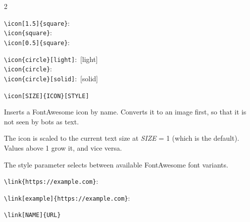 \begin{paracol}{2}
    \vspace{4mm}

    \switchcolumn*

    \begin{center}
      \color{page}

      \begingroup\color{lightgray}\verb!\icon[1.5]{square}!:\endgroup\ \\
      \begingroup\color{lightgray}\verb!\icon{square}!:\endgroup\ \\
      \begingroup\color{lightgray}\verb!\icon[0.5]{square}!:\endgroup\ 

      \begingroup\color{lightgray}\verb!\icon{circle}[light]!:\endgroup\ [light]\\
      \begingroup\color{lightgray}\verb!\icon{circle}!:\endgroup\ \\
      \begingroup\color{lightgray}\verb!\icon{circle}[solid]!:\endgroup\ [solid]

    \end{center}

    \switchcolumn

    \verb!\icon[SIZE]{ICON}[STYLE]!

    Inserts a FontAwesome icon by name.
    Converts it to an image first, so that it is not seen by bots as text.

    The icon is scaled to the current text size at \textit{SIZE} = 1 (which is the default).
    Values above 1 grow it, and vice versa.

    The style parameter selects between available FontAwesome font variants.

    \vspace{4mm}

    \switchcolumn*

    \begin{center}
      \color{page}

      \begingroup\color{lightgray}\verb!\link{https://example.com}!:\endgroup\\
      
      \begingroup\color{lightgray}\verb!\link[example]{https://example.com}!:\endgroup\\

    \end{center}

    \switchcolumn

    \verb!\link[NAME]{URL}!


\end{paracol}
